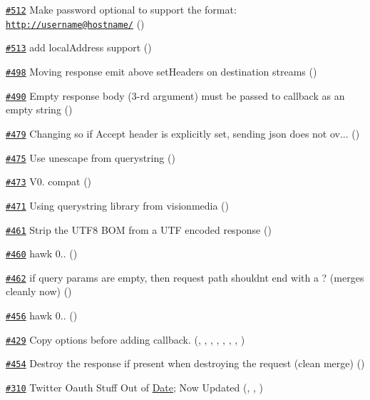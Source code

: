\begin{DoxyItemize}
\item \href{https://github.com/request/request/pull/512}{\tt \#512} Make password optional to support the format\+: \href{http://username@hostname/}{\tt http\+://username@hostname/} ()
\item \href{https://github.com/request/request/pull/513}{\tt \#513} add \textquotesingle{}local\+Address\textquotesingle{} support ()
\item \href{https://github.com/request/request/pull/498}{\tt \#498} Moving response emit above set\+Headers on destination streams ()
\item \href{https://github.com/request/request/pull/490}{\tt \#490} Empty response body (3-\/rd argument) must be passed to callback as an empty string ()
\item \href{https://github.com/request/request/pull/479}{\tt \#479} Changing so if Accept header is explicitly set, sending json does not ov... ()
\item \href{https://github.com/request/request/pull/475}{\tt \#475} Use {\ttfamily unescape} from {\ttfamily querystring} ()
\item \href{https://github.com/request/request/pull/473}{\tt \#473} V0. compat ()
\item \href{https://github.com/request/request/pull/471}{\tt \#471} Using querystring library from visionmedia ()
\item \href{https://github.com/request/request/pull/461}{\tt \#461} Strip the U\+T\+F8 B\+OM from a U\+TF encoded response ()
\item \href{https://github.com/request/request/pull/460}{\tt \#460} hawk 0.. ()
\item \href{https://github.com/request/request/pull/462}{\tt \#462} if query params are empty, then request path shouldn\textquotesingle{}t end with a \textquotesingle{}?\textquotesingle{} (merges cleanly now) ()
\item \href{https://github.com/request/request/pull/456}{\tt \#456} hawk 0.. ()
\item \href{https://github.com/request/request/pull/429}{\tt \#429} Copy options before adding callback. (, , , , , , , )
\item \href{https://github.com/request/request/pull/454}{\tt \#454} Destroy the response if present when destroying the request (clean merge) ()
\item \href{https://github.com/request/request/pull/310}{\tt \#310} Twitter Oauth Stuff Out of \mbox{\hyperlink{classDate}{Date}}; Now Updated (, , )

\end{DoxyItemize}
